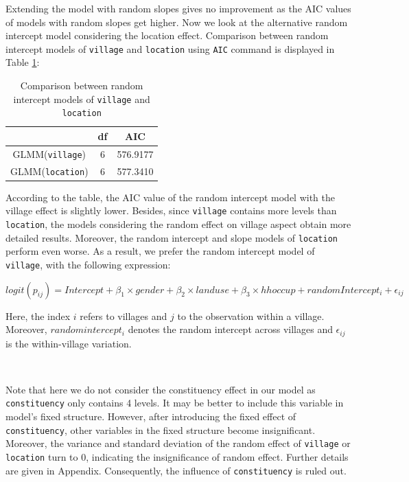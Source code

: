 \documentclass[11pt,twoside]{article}
\numberwithin{Theorem}{section}
\numberwithin{Definition}{section}
\numberwithin{Lemma}{section}
\numberwithin{Algorithm}{section}
\numberwithin{equation}{section}
\begin{document}
Extending the model with random slopes gives no improvement as the AIC values of models with random slopes get higher. Now we look at the alternative random intercept model considering the location effect. Comparison between random intercept models of \texttt{village} and \texttt{location} using \texttt{AIC} command is displayed in Table \ref{tab:glmm3}:

\begin{table}[!h]
	\centering
	\begin{tabular}{|c|c|c|}
		\hline
		& df & AIC  \\  
		\hline
		GLMM(\texttt{village}) & 6 & 576.9177	\\	
		GLMM(\texttt{location}) & 6 & 577.3410 \\
		\hline
	\end{tabular}
	\caption{Comparison between random intercept models of \texttt{village} and \texttt{location}}
	\label{tab:glmm3}
\end{table}

According to the table, the AIC value of the random intercept model with the village effect is slightly lower. Besides, since \texttt{village} contains more levels than \texttt{location}, the models considering the random effect on village aspect obtain more detailed results. Moreover, the random intercept and slope models of \texttt{location} perform even worse. As a result, we prefer the random intercept model of \texttt{village}, with the following expression:

$$logit(p_{ij}) = Intercept + \beta_1 \times gender + \beta_2 \times landuse + \beta_3 \times hhoccup + randomIntercept_i + \epsilon_{ij}$$

Here, the index $i$ refers to villages and $j$ to the observation within a village. Moreover, $randomintercept_i$ denotes the random intercept across villages and $\epsilon_{ij}$ is the within-village variation.

\

Note that here we do not consider the constituency effect in our model as \texttt{constituency} only contains 4 levels. It may be better to include this variable in model's fixed structure. However, after introducing the fixed effect of \texttt{constituency}, other variables in the fixed structure become insignificant. Moreover, the variance and standard deviation of the random effect of \texttt{village} or \texttt{location} turn to 0, indicating the insignificance of random effect. Further details are given in Appendix. Consequently, the influence of \texttt{constituency} is ruled out.
\end{document}
